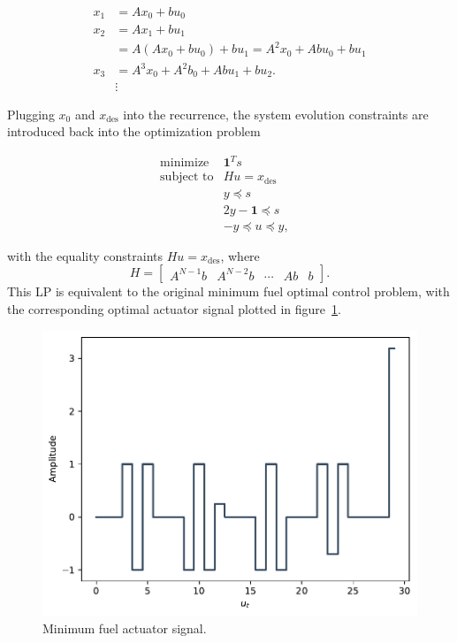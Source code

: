\documentclass[12pt,reqno]{article}
\theoremstyle{definition}
\numberwithin{equation}{section}
\begin{document}
   \[\begin{aligned}
    x_1 &= Ax_0 + bu_0 \\
    x_2 &= Ax_1 + bu_1 \\
    &= A(Ax_0 + bu_0)+ bu_1 = A^2x_0 + Abu_0 + bu_1 \\
    x_3 &= A^3x_0 + A^2b_0 + Abu_1 + bu_2. \\
    &\vdots
    \end{aligned}\]

    Plugging $x_0$ and $x_{\mathrm{des}}$ into the recurrence, the system evolution constraints
    are introduced back into the optimization problem
    
    \[\begin{array}{lll}
        \text{minimize} \; & \bm{1}^T s & \\
        \text{subject to} & Hu = x_{\mathrm{des}} \; &\\
        & y \preceq s & \\
        & 2y - \bm{1} \preceq s & \\
        & -y \preceq u \preceq y, & 
        \end{array}\]

    with the equality constraints $Hu = x_{\mathrm{des}}$, where
    \[H = \begin{bmatrix}
        A^{N-1}b & A^{N-2}b & \cdots & Ab & b
    \end{bmatrix}.\]
    This LP is equivalent to the original minimum fuel optimal control problem, with the corresponding optimal actuator signal
    plotted in figure~\ref{fig:4-16_min-fuel}.
   

   \begin{figure}[htbp]
    \centering
    \includegraphics[width=\linewidth]{../examples/364a/cvx-ch4/4-16_min-fuel.pdf}
    \caption{Minimum fuel actuator signal.}
    \label{fig:4-16_min-fuel}
    \end{figure}
\end{document}
